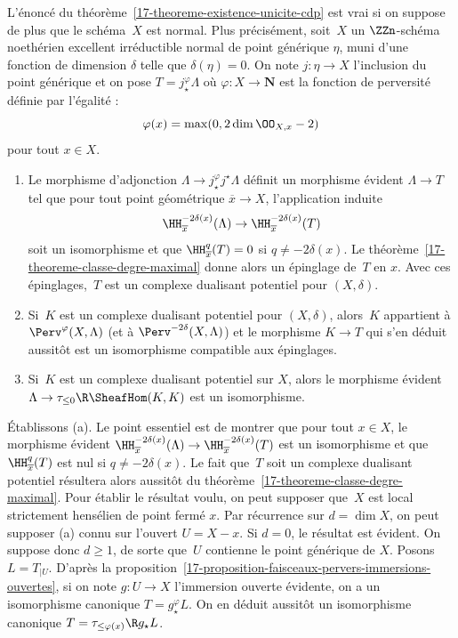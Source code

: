 \documentclass[10pt]{../fichiers-configuration-latex/smfart}
\begin{document}
\begin{proposition2}\label{17-proposition-theoreme-existence-unicite-cdp-cas-normal}
L'énoncé du théorème~\ref{17-theoreme-existence-unicite-cdp} est vrai si on
suppose de plus que le schéma $X$ est normal.
Plus précisément, soit $X$ un $\ZZn$-schéma
noethérien excellent irréductible normal
de point générique $\eta$,
muni d'une fonction de dimension $\delta$ telle que $\delta(\eta)=0$. On
note $j\colon \eta\to X$ l'inclusion du point générique et on pose
$T=j^\varphi_\star \Lambda$ où $\varphi\colon X\to\mathbf{N}$ est la
fonction de perversité définie par l'égalité :
\[\varphi(x)=\max(0,2\dim \OO_{X,x}-2)\]
pour tout $x\in X$.
\begin{enumerate}
\item[(a)] Le morphisme d'adjonction $\Lambda\to j_\star^\varphi
j^\star\Lambda$ définit un morphisme évident $\Lambda\to T $ tel que pour
tout point géométrique $\overline x\to X$, l'application induite
\[\HH^{-2\delta(x)}_{\overline x}(\Lambda)\to \HH^{-2\delta(x)}_{\overline x}(T)\]
soit un isomorphisme et que $\HH^q_{\overline x}(T)=0$ si $q\neq -2\delta(x)$.
Le théorème~\ref{17-theoreme-classe-degre-maximal} donne alors un épinglage
de $T$ en $x$. Avec ces épinglages, $T$ est un complexe dualisant
potentiel pour $(X,\delta)$.
\item[(b)] Si $K$ est un complexe dualisant potentiel pour $(X,\delta)$,
alors $K$ appartient à $\Perv^{\varphi}(X,\Lambda)$
(et à $\Perv^{-2\delta}(X,\Lambda)$)
et le morphisme $K\to T$ qui s'en déduit aussitôt est un isomorphisme
compatible aux épinglages.
\item[(c)] Si $K$ est un complexe dualisant potentiel sur $X$, alors le
morphisme évident $\Lambda\to\tau_{\leq 0}\R \SheafHom(K,K)$ est un
isomorphisme.
\end{enumerate}
\end{proposition2}

Établissons (a). Le point essentiel est de montrer que pour tout $x\in X$,
le morphisme évident
$\HH^{-2\delta(x)}_{\overline x}(\Lambda)\to \HH^{-2\delta(x)}_{\overline x}(T)$
est un isomorphisme et que $\HH^q_{\overline x}(T)$ est nul si $q\neq
-2\delta(x)$. Le fait que $T$ soit un complexe dualisant
potentiel résultera alors aussitôt du
théorème~\ref{17-theoreme-classe-degre-maximal}. Pour établir le résultat
voulu, on peut supposer que $X$ est local strictement hensélien de
point fermé $x$. Par récurrence sur $d=\dim X$, on peut supposer (a) connu
sur l'ouvert $U=X-x$. Si $d=0$, le résultat est évident. On suppose donc
$d\geq 1$, de sorte que $U$ contienne le point générique de $X$.
Posons $L=T_{|U}$. D'après la
proposition~\ref{17-proposition-faisceaux-pervers-immersions-ouvertes}, si on
note $g\colon U\to X$ l'immersion ouverte évidente, on a un isomorphisme
canonique $T=g_\star^\varphi L$. On en déduit aussitôt un isomorphisme
canonique $T=\tau_{\leq \varphi(x)}\R g_\star L$.
\end{document}
